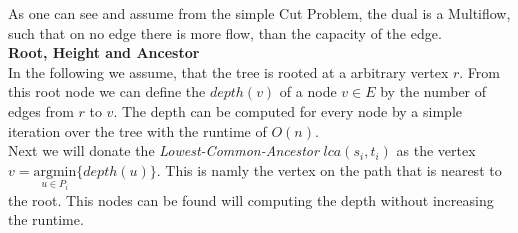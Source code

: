 As one can see and assume from the simple Cut Problem, the dual is a Multiflow, such that
on no edge there is more flow, than the capacity of the edge.\\

\textbf{Root, Height and Ancestor}\\
In the following we assume, that the tree is rooted at a arbitrary vertex $r$. From this
root node we can define the $depth(v)$ of a node $v \in E$ by the number of edges from
$r$ to $v$. The depth can be computed for every node by a simple iteration over the tree
with the runtime of $O(n)$.\\

Next we will donate the \emph{Lowest-Common-Ancestor} $lca(s_i,t_i)$ as the vertex
$v = \underset{u \in P_i}{\text{argmin}} \{ depth(u) \}$. This is namly the vertex on
the path that is nearest to the root. This nodes can be found will computing the
depth without increasing the runtime.
